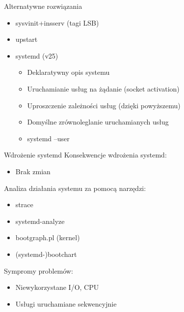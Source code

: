 \documentclass[presentation,aspectratio=43,12pt]{beamer}
\begin{document}
\begin{frame}[label=sec-4-3]{Alternatywne rozwiązania}
\begin{itemize}
\item sysvinit+insserv (tagi LSB)
\item upstart
\item systemd (v25)
\begin{itemize}
\item <2-> Deklaratywny opis systemu
\item <2-> Uruchamianie usług na żądanie (socket activation)
\item <2-> Uproszczenie zależności usług (dzięki powyższemu)
\item <2-> Domyślne zrównoleglanie uruchamianych usług
\item <2-> systemd --user
\end{itemize}
\end{itemize}

\end{frame}
\begin{frame}[label=sec-4-4]{Wdrożenie systemd}
Konsekwencje wdrożenia systemd:

\pause

\begin{itemize}
\item Brak zmian
\end{itemize}

\pause

Analiza działania systemu za pomocą narzędzi:
\begin{itemize}
\item strace
\item systemd-analyze
\item bootgraph.pl (kernel)
\item (systemd-)bootchart
\end{itemize}

\pause
Sympromy problemów:
\begin{itemize}
\item Niewykorzystane I/O, CPU
\item Usługi uruchamiane sekwencyjnie
\end{itemize}


\end{frame}
\end{document}
